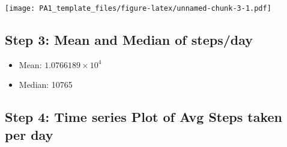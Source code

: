 \documentclass[]{article}
\newenvironment{Shaded}{\begin{snugshade}}{\end{snugshade}}
\newcommand{\CommentTok}[1]{\textcolor[rgb]{0.56,0.35,0.01}{\textit{#1}}}
\newcommand{\DataTypeTok}[1]{\textcolor[rgb]{0.13,0.29,0.53}{#1}}
\newcommand{\DecValTok}[1]{\textcolor[rgb]{0.00,0.00,0.81}{#1}}
\newcommand{\KeywordTok}[1]{\textcolor[rgb]{0.13,0.29,0.53}{\textbf{#1}}}
\newcommand{\NormalTok}[1]{#1}
\newcommand{\OperatorTok}[1]{\textcolor[rgb]{0.81,0.36,0.00}{\textbf{#1}}}
\newcommand{\StringTok}[1]{\textcolor[rgb]{0.31,0.60,0.02}{#1}}
\providecommand{\tightlist}{%
  \setlength{\itemsep}{0pt}\setlength{\parskip}{0pt}}
\begin{document}
\begin{Shaded}
\end{Shaded}

\texttt{[image: PA1\_template\_files/figure-latex/unnamed-chunk-3-1.pdf]}

\hypertarget{step-3-mean-and-median-of-stepsday}{%
\subsection{Step 3: Mean and Median of
steps/day}\label{step-3-mean-and-median-of-stepsday}}

\begin{Shaded}
\end{Shaded}

\begin{itemize}
\tightlist
\item
  Mean: \ensuremath{1.0766189\times 10^{4}}
\item
  Median: 10765
\end{itemize}

\hypertarget{step-4-time-series-plot-of-avg-steps-taken-per-day}{%
\subsection{Step 4: Time series Plot of Avg Steps taken per
day}\label{step-4-time-series-plot-of-avg-steps-taken-per-day}}
\end{document}
